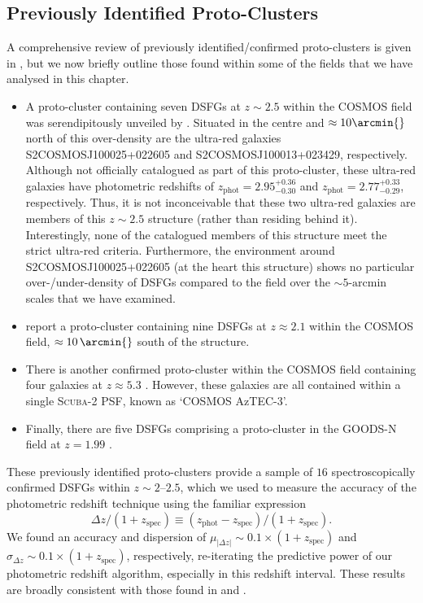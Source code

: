 \documentclass[a4paper, fleqn, usenatbib]{mnras}
\newcommand{\scuba}{\mbox{\textsc{Scuba}-2}}
\newcommand{\urgs}{ultra-red galaxies}
\newcommand{\zphot}{z_{\text{phot}}}
\newcommand{\zspec}{z_{\text{spec}}}
\begin{document}
\subsection{Previously Identified Proto-Clusters}

A comprehensive review of previously identified/confirmed proto-clusters is given in \citet{casey16}, but we now briefly outline those found within some of the fields that we have analysed in this chapter.

\begin{itemize}
    \item A proto-cluster containing seven DSFGs at $z\sim2.5$ within the COSMOS field was serendipitously unveiled by \citet{casey15}.
    Situated in the centre and $\approx10\arcmin{}$ north of this over-density are the \urgs{} \mbox{S2COSMOSJ100025+022605} and \mbox{S2COSMOSJ100013+023429}, respectively.
    Although not officially catalogued as part of this proto-cluster, these \urgs{} have photometric redshifts of $\zphot{}=2.95^{+0.36}_{-0.30}$ and $\zphot{}=2.77^{+0.33}_{-0.29}$, respectively.
    Thus, it is not inconceivable that these two \urgs{} are members of this $z\sim2.5$ structure (rather than residing behind it).
    Interestingly, none of the catalogued members of this structure meet the strict ultra-red criteria.
    Furthermore, the environment around \mbox{S2COSMOSJ100025+022605} (at the heart this \citeauthor{casey15} structure) shows no particular over-/under-density of DSFGs compared to the field over the $\sim5\text{-}\text{arcmin}$ scales that we have examined.
    \item \citet{hung16} report a proto-cluster containing nine DSFGs at $z\approx2.1$ within the COSMOS field, $\approx10\,\arcmin{}$ south of the \citeauthor{casey15} structure.
    \item There is another confirmed proto-cluster within the COSMOS field containing four galaxies at $z\approx5.3$ \citep[the AzTEC-3 over-density ---][]{capak11, riechers10}.
    However, these galaxies are all contained within a single \scuba{} PSF, known as `COSMOS AzTEC-3'.
    \item Finally, there are five DSFGs comprising a proto-cluster in the GOODS-N field at $z=1.99$ \citep{blain04, chapman09}.
\end{itemize}

These previously identified proto-clusters provide a sample of $16$ spectroscopically confirmed DSFGs within $z\sim2\textrm{--}2.5$, which we used to measure the accuracy of the photometric redshift technique using the familiar expression $$\Delta z/(1+\zspec{}) \equiv (\zphot{} - \zspec{})/(1 + \zspec{}).$$
We found an accuracy and dispersion of $\mu_{|\Delta z|}\sim0.1\times(1+\zspec{})$ and $\sigma_{\Delta z}\sim0.1\times(1+\zspec{})$, respectively, re-iterating the predictive power of our photometric redshift algorithm, especially in this redshift interval.
These results are broadly consistent with those found in  and .
\end{document}
